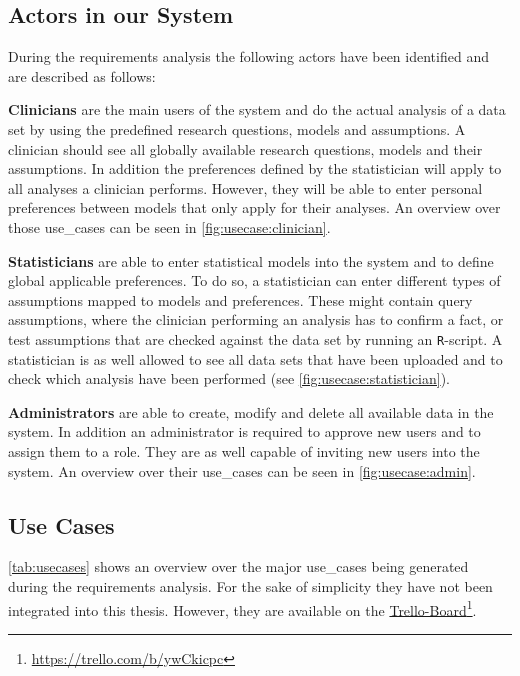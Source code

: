 \subsection{Actors in our System}
\label{sub:sassoon:actors}
During the requirements analysis the following actors have been identified and are described as follows:

\textbf{Clinicians} are the main users of the system and do the actual analysis of a data set by using the predefined research questions, models and assumptions. A clinician should see all globally available research questions, models and their assumptions. In addition the preferences defined by the statistician will apply to all analyses a clinician performs. However, they will be able to enter personal preferences between models that only apply for their analyses. An overview over those \glspl{use_case} can be seen in \autoref{fig:usecase:clinician}.

\textbf{Statisticians} are able to enter statistical models into the system and to define global applicable preferences. To do so, a statistician can enter different types of assumptions mapped to models and preferences. These might contain query assumptions, where the clinician performing an analysis has to confirm a fact, or test assumptions that are checked against the data set by running an \texttt{R}-script. A statistician is as well allowed to see all data sets that have been uploaded and to check which analysis have been performed (see \autoref{fig:usecase:statistician}).



\textbf{Administrators} are able to create, modify and delete all available data in the system. In addition an administrator is required to approve new users and to assign them to a role. They are as well capable of inviting new users into the system. An overview over their \glspl{use_case} can be seen in \autoref{fig:usecase:admin}.





\subsection{Use Cases}
\label{sub:use_cases}
\autoref{tab:usecases} shows an overview over the major \glspl{use_case} being generated during the requirements analysis. For the sake of simplicity they have not been integrated into this thesis. However, they are available on the \href{https://trello.com/b/ywCkicpc}{Trello-Board}\footnote{\url{https://trello.com/b/ywCkicpc}}.

